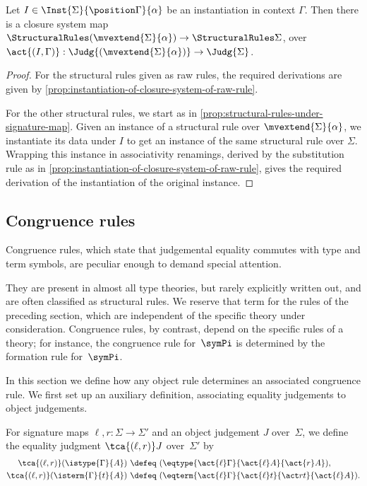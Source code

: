 \begin{proposition}  \label{prop:instantiation-of-structural-rules}%
  Let $I \in \Inst{\Sigma}{\position \Gamma}{\alpha}$ be an instantiation in context $\Gamma$.
  Then there is a closure system map $\StructuralRules (\mvextend{\Sigma}{\alpha}) \to \StructuralRules \Sigma$, over $\act{(I,\Gamma)} : \Judg {(\mvextend{\Sigma}{\alpha})} \to \Judg{\Sigma}$.
\end{proposition}

\begin{proof}
  For the structural rules given as raw rules, the required derivations are given by \cref{prop:instantiation-of-closure-system-of-raw-rule}.
  
  For the other structural rules, we start as in \cref{prop:structural-rules-under-signature-map}.
  Given an instance of a structural rule over $\mvextend{\Sigma}{\alpha}$, we instantiate its data under $I$ to get an instance of the same structural rule over $\Sigma$.
  Wrapping this instance in associativity renamings, derived by the substitution rule as in \cref{prop:instantiation-of-closure-system-of-raw-rule}, gives the required derivation of the instantiation of the original instance.
\end{proof}

\subsection{Congruence rules}
\label{sec:congruence-rules}

Congruence rules, which state that judgemental equality commutes with type and term symbols, are peculiar enough to demand special attention.

They are present in almost all type theories, but rarely explicitly written out, and are often classified as structural rules.
%
We reserve that term for the rules of the preceding section, which are independent of the specific theory under consideration.
%
Congruence rules, by contrast, depend on the specific rules of a theory; for instance, the congruence rule for~$\symPi$ is determined by the formation rule for~$\symPi$.

In this section we define how any object rule determines an associated congruence rule.
%
We first set up an auxiliary definition, associating equality judgements to object judgements.

\begin{definition}
  \label{def:judgement-associated-congruence}
  For signature maps $\ell, r : \Sigma \to \Sigma'$ and an object judgement $J$ over~$\Sigma$, we define the equality judgment $\tca{(\ell,r)}J$ over~$\Sigma'$ by
  \begin{align*}
     \tca{(\ell,r)}(\istype{\Gamma}{A})
    \ &\defeq \ 
    (\eqtype{\act{\ell} \Gamma}{\act{\ell} A}{\act{r} A}),
    \\
    \tca{(\ell,r)}(\isterm{\Gamma}{t}{A})
    \  &\defeq \ 
    (\eqterm{\act{\ell} \Gamma}{\act{\ell} t}{\act r t}{\act{\ell} A}).
  \end{align*}
\end{definition}

